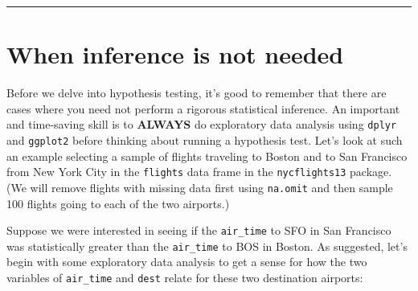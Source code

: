 \documentclass[12pt,]{krantz}
\makeatletter
\newenvironment{Shaded}{\begin{snugshade}}{\end{snugshade}}
\newcommand{\KeywordTok}[1]{\textcolor[rgb]{0.27,0.27,0.27}{\textbf{#1}}}
\newcommand{\DataTypeTok}[1]{\textcolor[rgb]{0.27,0.27,0.27}{#1}}
\newcommand{\DecValTok}[1]{\textcolor[rgb]{0.06,0.06,0.06}{#1}}
\newcommand{\StringTok}[1]{\textcolor[rgb]{0.5,0.5,0.5}{#1}}
\newcommand{\OperatorTok}[1]{\textcolor[rgb]{0.43,0.43,0.43}{\textbf{#1}}}
\newcommand{\NormalTok}[1]{#1}
\newenvironment{kframe}{%
\medskip{}
\setlength{\fboxsep}{.8em}
 \def\at@end@of@kframe{}%
 \ifinner\ifhmode%
  \def\at@end@of@kframe{\end{minipage}}%
  \begin{minipage}{\columnwidth}%
 \fi\fi%
 \def\FrameCommand##1{\hskip\@totalleftmargin \hskip-\fboxsep
 \colorbox{shadecolor}{##1}\hskip-\fboxsep
     \hskip-\linewidth \hskip-\@totalleftmargin \hskip\columnwidth}%
 \MakeFramed {\advance\hsize-\width
   \@totalleftmargin\z@ \linewidth\hsize
   \@setminipage}}%
 {\par\unskip\endMakeFramed%
 \at@end@of@kframe}
\renewenvironment{Shaded}{\begin{kframe}}{\end{kframe}}
\makeatother
\begin{document}
\begin{center}\rule{0.5\linewidth}{\linethickness}\end{center}

\section{When inference is not
needed}\label{when-inference-is-not-needed}

Before we delve into hypothesis testing, it's good to remember that
there are cases where you need not perform a rigorous statistical
inference. An important and time-saving skill is to \textbf{ALWAYS} do
exploratory data analysis using \texttt{dplyr} and \texttt{ggplot2}
before thinking about running a hypothesis test. Let's look at such an
example selecting a sample of flights traveling to Boston and to San
Francisco from New York City in the \texttt{flights} data frame in the
\texttt{nycflights13} package. (We will remove flights with missing data
first using \texttt{na.omit} and then sample 100 flights going to each
of the two airports.)

\begin{Shaded}
\end{Shaded}

Suppose we were interested in seeing if the \texttt{air\_time} to SFO in
San Francisco was statistically greater than the \texttt{air\_time} to
BOS in Boston. As suggested, let's begin with some exploratory data
analysis to get a sense for how the two variables of \texttt{air\_time}
and \texttt{dest} relate for these two destination airports:

\begin{Shaded}
\end{Shaded}
\end{document}
